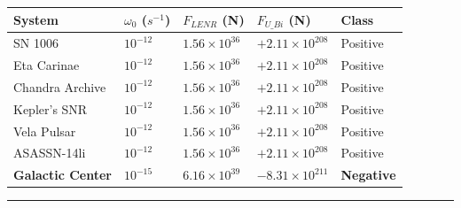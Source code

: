 \documentclass[
  11pt,
]{article}
\newcounter{none} %
\begin{document}
{\def\LTcaptype{none} %
\begin{longtable}[]{@{}
  >{\raggedright\arraybackslash}p{}
  >{\raggedright\arraybackslash}p{}
  >{\raggedright\arraybackslash}p{}
  >{\raggedright\arraybackslash}p{}
  >{\raggedright\arraybackslash}p{}@{}}
\toprule\noalign{}
\begin{minipage}[b]{\linewidth}\raggedright
System
\end{minipage} & \begin{minipage}[b]{\linewidth}\raggedright
\(\omega_0\) (\(s^{-1}\))
\end{minipage} & \begin{minipage}[b]{\linewidth}\raggedright
\(F_{LENR}\) (N)
\end{minipage} & \begin{minipage}[b]{\linewidth}\raggedright
\(F_{U\_Bi}\) (N)
\end{minipage} & \begin{minipage}[b]{\linewidth}\raggedright
Class
\end{minipage} \\
\midrule\noalign{}
\endhead
\bottomrule\noalign{}
\endlastfoot
SN 1006 & \(10^{-12}\) & \(1.56\times10^{36}\) & \(+2.11\times10^{208}\)
& Positive \\
Eta Carinae & \(10^{-12}\) & \(1.56\times10^{36}\) &
\(+2.11\times10^{208}\) & Positive \\
Chandra Archive & \(10^{-12}\) & \(1.56\times10^{36}\) &
\(+2.11\times10^{208}\) & Positive \\
Kepler's SNR & \(10^{-12}\) & \(1.56\times10^{36}\) &
\(+2.11\times10^{208}\) & Positive \\
Vela Pulsar & \(10^{-12}\) & \(1.56\times10^{36}\) &
\(+2.11\times10^{208}\) & Positive \\
ASASSN-14li & \(10^{-12}\) & \(1.56\times10^{36}\) &
\(+2.11\times10^{208}\) & Positive \\
\textbf{Galactic Center} & \(10^{-15}\) & \(6.16\times10^{39}\) &
\(-8.31\times10^{211}\) & \textbf{Negative} \\
\end{longtable}
}

\begin{center}\rule{0.5\linewidth}{0.5pt}\end{center}
\end{document}
